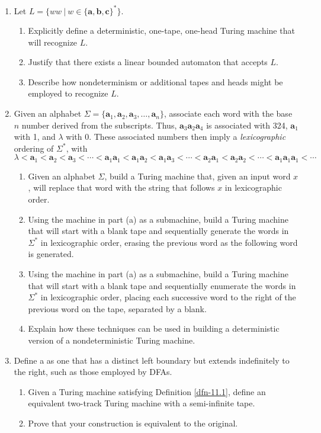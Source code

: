\begin{enumerate}[{11.}1.]
\item Let $L=\{ww\ |\ w\in\{\pmb{a},\pmb{b},\pmb{c}\}^*\}$.
\begin{enumerate}
\item Explicitly define a deterministic, one-tape, one-head Turing machine that
will recognize $L$.
\item Justify that there exists a linear bounded automaton that accepts $L$.
\item Describe how nondeterminism or additional tapes and heads might be
employed to recognize $L$.
\end{enumerate}

\item Given an alphabet $\Sigma=\{\pmb{a}_1,\pmb{a}_2,\pmb{a}_3,\ldots,\pmb{a}_n\}$,
associate each word with the base $n$ number derived from the subscripts. Thus,
$\pmb{a}_3\pmb{a}_2\pmb{a}_4$ is associated with 324, $\pmb{a}_1$ with 1,
and $\lambda$ with 0. These associated numbers then imply a \emph{lexicographic}
ordering of $\Sigma^*$, with
\[ \lambda<\pmb{a}_1<\pmb{a}_2<\pmb{a}_3<\cdots<\pmb{a}_1\pmb{a}_1<\pmb{a}_1
	\pmb{a}_2<\pmb{a}_1\pmb{a}_3<\cdots<\pmb{a}_2\pmb{a}_1<\pmb{a}_2
	\pmb{a}_2<\cdots<\pmb{a}_1\pmb{a}_1\pmb{a}_1<\cdots \]
\begin{enumerate}
\item Given an alphabet $\Sigma$, build a Turing machine that, given an input
word $x$, will replace that word with the string that follows $x$ in
lexicographic order.
\item Using the machine in part (a) as a submachine, build a Turing machine that
will start with a blank tape and sequentially generate the words in $\Sigma^*$
in lexicographic order, erasing the previous word as the following word is
generated.
\item Using the machine in part (a) as a submachine, build a Turing machine that
will start with a blank tape and sequentially enumerate the words in $\Sigma^*$
in lexicographic order, placing each successive word to the right of the
previous word on the tape, separated by a blank.
\item Explain how these techniques can be used in building a deterministic
version of a nondeterministic Turing machine.
\end{enumerate}

\item Define a \emph{} as one that has a distinct left
boundary but extends indefinitely to the right, such as those employed by DFAs.
\begin{enumerate}
\item Given a Turing machine satisfying Definition \ref{dfn-11.1}, define an equivalent
two-track Turing machine with a semi-infinite tape.
\item Prove that your construction is equivalent to the original.
\end{enumerate}


\end{enumerate}
